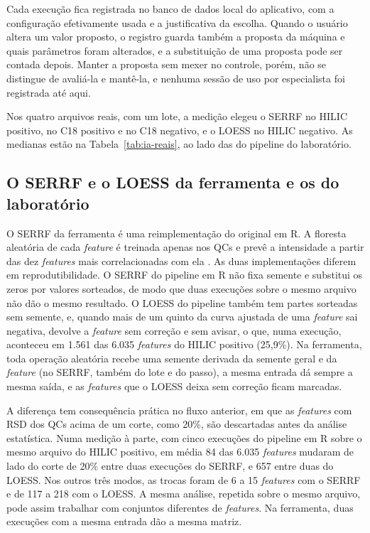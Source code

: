Cada execução fica registrada no banco de dados local do aplicativo, com a configuração efetivamente usada e a justificativa da escolha. Quando o usuário altera um valor proposto, o registro guarda também a proposta da máquina e quais parâmetros foram alterados, e a substituição de uma proposta pode ser contada depois. Manter a proposta sem mexer no controle, porém, não se distingue de avaliá-la e mantê-la, e nenhuma sessão de uso por especialista foi registrada até aqui.

Nos quatro arquivos reais, com um lote, a medição elegeu o SERRF no HILIC positivo, no C18 positivo e no C18 negativo, e o LOESS no HILIC negativo. As medianas estão na Tabela~\ref{tab:ia-reais}, ao lado das do pipeline do laboratório.

\subsection{O SERRF e o LOESS da ferramenta e os do laboratório}

O SERRF da ferramenta é uma reimplementação do original em R. A floresta aleatória \cite{breiman2001random} de cada \emph{feature} é treinada apenas nos QCs e prevê a intensidade a partir das dez \emph{features} mais correlacionadas com ela \cite{fan2019systematic}. As duas implementações diferem em reprodutibilidade. O SERRF do pipeline em R não fixa semente e substitui os zeros por valores sorteados, de modo que duas execuções sobre o mesmo arquivo não dão o mesmo resultado. O LOESS do pipeline também tem partes sorteadas sem semente, e, quando mais de um quinto da curva ajustada de uma \emph{feature} sai negativa, devolve a \emph{feature} sem correção e sem avisar, o que, numa execução, aconteceu em 1.561 das 6.035 \emph{features} do HILIC positivo (25,9\%). Na ferramenta, toda operação aleatória recebe uma semente derivada da semente geral e da \emph{feature} (no SERRF, também do lote e do passo), a mesma entrada dá sempre a mesma saída, e as \emph{features} que o LOESS deixa sem correção ficam marcadas.

A diferença tem consequência prática no fluxo anterior, em que as \emph{features} com RSD dos QCs acima de um corte, como 20\%, são descartadas antes da análise estatística. Numa medição à parte, com cinco execuções do pipeline em R sobre o mesmo arquivo do HILIC positivo, em média 84 das 6.035 \emph{features} mudaram de lado do corte de 20\% entre duas execuções do SERRF, e 657 entre duas do LOESS. Nos outros três modos, as trocas foram de 6 a 15 \emph{features} com o SERRF e de 117 a 218 com o LOESS. A mesma análise, repetida sobre o mesmo arquivo, pode assim trabalhar com conjuntos diferentes de \emph{features}. Na ferramenta, duas execuções com a mesma entrada dão a mesma matriz.

